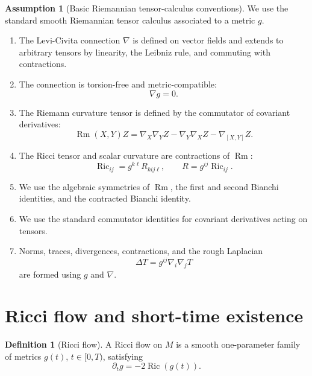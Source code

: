 \documentclass[11pt]{article}
\theoremstyle{plain}
\theoremstyle{definition}
\newtheorem{definition}[theorem]{Definition}
\newtheorem{assumption}[theorem]{Assumption}
\theoremstyle{remark}
\newcommand{\Ric}{\operatorname{Ric}}
\newcommand{\Rm}{\operatorname{Rm}}
\begin{document}
\begin{assumption}[Basic Riemannian tensor-calculus conventions]
\label{ass:riemannian-calculus}
We use the standard smooth Riemannian tensor calculus associated to a metric
$g$.
\begin{enumerate}[label=(\arabic*)]
  \item The Levi-Civita connection $\nabla$ is defined on vector fields and
  extends to arbitrary tensors by linearity, the Leibniz rule, and commuting
  with contractions.

  \item The connection is torsion-free and metric-compatible:
  \[
  \nabla g=0.
  \]

  \item The Riemann curvature tensor is defined by the commutator of covariant
  derivatives:
  \[
  \Rm(X,Y)Z
  =
  \nabla_X\nabla_YZ
  -\nabla_Y\nabla_XZ
  -\nabla_{[X,Y]}Z.
  \]

  \item The Ricci tensor and scalar curvature are contractions of $\Rm$:
  \[
  \Ric_{ij}=g^{k\ell}R_{kij\ell},
  \qquad
  R=g^{ij}\Ric_{ij}.
  \]

  \item We use the algebraic symmetries of $\Rm$, the first and second Bianchi
  identities, and the contracted Bianchi identity.

  \item We use the standard commutator identities for covariant derivatives
  acting on tensors.

  \item Norms, traces, divergences, contractions, and the rough Laplacian
  \[
  \Delta T=g^{ij}\nabla_i\nabla_jT
  \]
  are formed using $g$ and $\nabla$.
\end{enumerate}
\end{assumption}

\section{Ricci flow and short-time existence}

\begin{definition}[Ricci flow]
\label{def:ricci-flow}
A Ricci flow on $M$ is a smooth one-parameter family of metrics $g(t)$,
$t\in[0,T)$, satisfying
\[
  \partial_tg=-2\Ric(g(t)).
\]
\end{definition}
\end{document}
